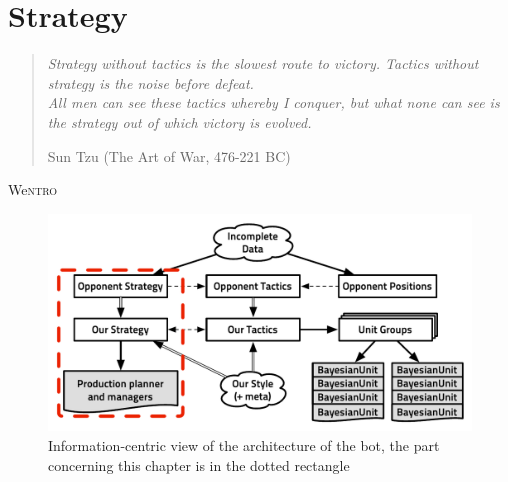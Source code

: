 \chapter{Strategy}
\label{chapter:strategy}
\begin{quotation}
\textit{Strategy without tactics is the slowest route to victory. Tactics without strategy is the noise before defeat.}\\
\textit{All men can see these tactics whereby I conquer, but what none can see is the strategy out of which victory is evolved.}\\
\begin{flushright}Sun Tzu (The Art of War, 476-221 BC)\end{flushright}
\end{quotation}

\lettrine{We}{ntro}

\chaptertoc

\begin{figure}[!ht]
\begin{center}
\includegraphics[width=13cm]{images/starcraft_bbq_concept_STRATEGY.pdf}
\end{center}
\caption{Information-centric view of the architecture of the bot, the part concerning this chapter is in the dotted rectangle}
\label{fig:conceptSTRATEGY}
\end{figure}

